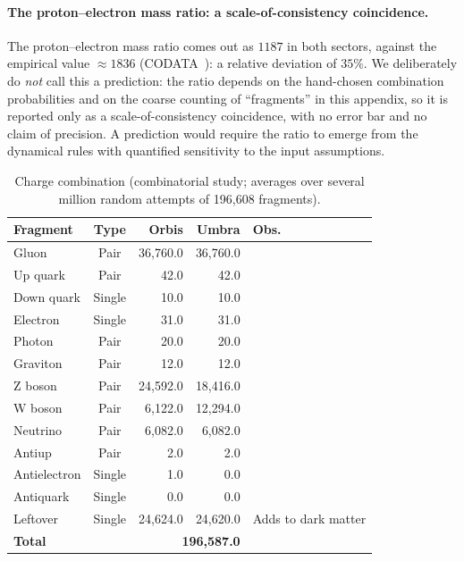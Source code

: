 \documentclass{ijuc}
\begin{document}
\paragraph{The proton--electron mass ratio: a scale-of-consistency coincidence.} The proton--electron mass ratio comes out as $1187$ in both sectors, against the empirical value $\approx1836$ (CODATA~\cite{codata}): a relative deviation of $35\%$.  We deliberately do \emph{not} call this a prediction: the ratio depends on the hand-chosen combination probabilities and on the coarse counting of ``fragments'' in this appendix, so it is reported only as a scale-of-consistency coincidence, with no error bar and no claim of precision.  A prediction would require the ratio to emerge from the dynamical rules with quantified sensitivity to the input assumptions.
\begin{table}[h]
\centering
\caption{Charge combination (combinatorial study; averages over several million random attempts of 196,608 fragments).}
\label{combina}
\begin{centering}
{\small{}}%
\begin{tabular}{|l|c|r|r|l|}
\hline
\textbf{\small{}Fragment} & \textbf{\small{}Type} & \textbf{\small{}Orbis} & \textbf{Umbra} & \textbf{\small{}Obs.}\tabularnewline
\hline
\hline
{\small{}Gluon} & {\small{}Pair} & {\small{}36,760.0} & {\small{}36,760.0} & \tabularnewline
\hline
{\small{}Up quark} & {\small{}Pair} & {\small{}42.0} & {\small{}42.0} & \tabularnewline
\hline
{\small{}Down quark} & {\small{}Single} & {\small{}10.0} & {\small{}10.0} & \tabularnewline
\hline
{\small{}Electron} & {\small{}Single} & {\small{}31.0} & {\small{}31.0} & \tabularnewline
\hline
{\small{}Photon} & {\small{}Pair} & {\small{}20.0} & {\small{}20.0} & \tabularnewline
\hline
{\small{}Graviton} & {\small{}Pair} & {\small{}12.0} & {\small{}12.0} & \tabularnewline
\hline
{\small{}Z boson} & {\small{}Pair} & {\small{}24,592.0} & {\small{}18,416.0} & \tabularnewline
\hline
{\small{}W boson} & {\small{}Pair} & {\small{}6,122.0} & {\small{}12,294.0} & \tabularnewline
\hline
{\small{}Neutrino} & {\small{}Pair} & {\small{}6,082.0} & {\small{}6,082.0} & \tabularnewline
\hline
{\small{}Antiup} & {\small{}Pair} & {\small{}2.0} & {\small{}2.0} & \tabularnewline
\hline
{\small{}Antielectron} & {\small{}Single} & {\small{}1.0} & {\small{}0.0} & \tabularnewline
\hline
{\small{}Antiquark} & {\small{}Single} & {\small{}0.0} & {\small{}0.0} & \tabularnewline
\hline
{\small{}Leftover} & {\small{}Single} & {\small{}24,624.0} & {\small{}24,620.0} & {\small{}Adds to dark matter}\tabularnewline
\hline
\textbf{\small{}Total} &  & \multicolumn{2}{r|}{\textbf{\small{}196,587.0 }} & \tabularnewline
\hline
\end{tabular}{\small\par}
\par\end{centering}
\medskip{}
\end{table}
\end{document}
